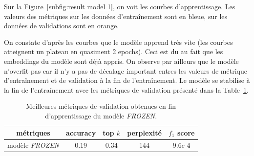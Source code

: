 \documentclass[a4paper]{article}
\begin{document}
Sur la Figure~\ref{subfig:result model 1}, on voit les courbes d'apprentissage. Les valeurs des métriques sur les données 
d'entraînement sont en bleue, sur les données de validations sont en orange.

On constate d'après les courbes que le modèle apprend très vite (les courbes atteignent un plateau en quasiment 2 epochs). Ceci 
est du au fait que les embeddings du modèle sont déjà appris. On observe par ailleurs que le modèle n'overfit pas car il n'y a pas 
de décalage important entres les valeurs de métrique d'entraînement et de validation à la fin de l'entraînement. Le modèle se 
stabilise à la fin de l'entraînement avec les métriques de validation présenté dans la Table~\ref{tab:metriques model1}.


\begin{table}
    \centering
    \begin{tabular}{|c|c|c|c|c|}
        \hline
        métriques & accuracy  & top $k$  & perplexité  & $f_1$ score \\
        \hline
        modèle \textit{FROZEN} & 0.19 & 0.34  & 144 & 9.6e-4 \\
        \hline
    \end{tabular}
    \caption{Meilleures métriques de validation obtenues en fin d'apprentissage du modèle \textit{FROZEN}.}
    \label{tab:metriques model1}
\end{table}
\end{document}
